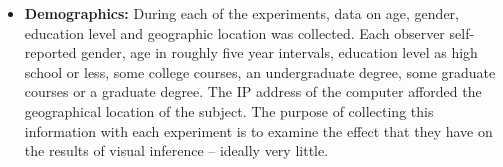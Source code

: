 \documentclass[10pt]{article}\usepackage[]{graphicx}\usepackage[]{color}
\begin{document}
\begin{itemize}
%

\item{\bf Demographics:}  During each of the experiments, data on age, gender, education level and geographic location was collected. Each observer self-reported gender, age in roughly five year intervals, education level as high school or less, some college courses, an undergraduate degree, some graduate courses or a graduate degree. The IP address of the computer afforded the geographical location of the subject. The purpose of collecting this information with each experiment is to examine the effect that they have on the results of visual inference -- ideally very little. 



\end{itemize}
\end{document}
